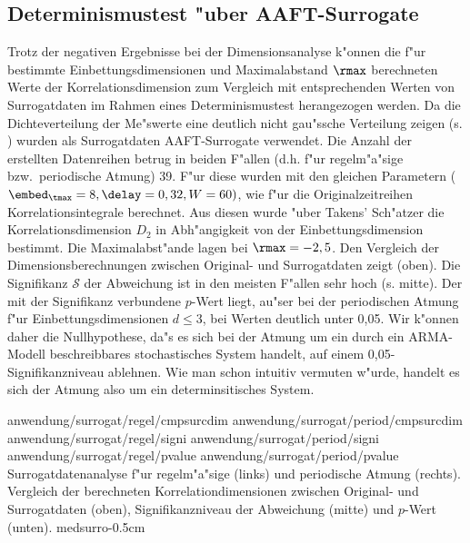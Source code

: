 \subsection{Determinismustest "uber AAFT-Surrogate}

Trotz der negativen Ergebnisse bei der Dimensionsanalyse k"onnen die f"ur bestimmte
Einbettungsdimensionen und Maximalabstand $\rmax$ berechneten Werte der
Korrelationsdimension zum Vergleich mit entsprechenden Werten von Surrogatdaten im Rahmen
eines Determinismustest herangezogen werden. Da die Dichteverteilung der Me"swerte eine
deutlich nicht gau"ssche Verteilung zeigen (s. ) wurden als Surrogatdaten
AAFT-Surrogate verwendet. Die Anzahl der erstellten Datenreihen betrug in beiden F"allen
(d.h. f"ur regelm"a"sige bzw.\ periodische Atmung) 39. F"ur diese wurden mit den gleichen
Parametern ($\embed_\tmax=8, \delay=0,32, W=60)$, wie f"ur die Originalzeitreihen
Korrelationsintegrale berechnet. Aus diesen wurde "uber Takens' Sch"atzer die
Korrelationsdimension $D_2$ in Abh"angigkeit von der Einbettungsdimension bestimmt. Die
Maximalabst"ande lagen bei $\rmax=-2,5$. Den Vergleich der Dimensionsberechnungen zwischen
Original- und Surrogatdaten zeigt  (oben).  Die Signifikanz $\mathcal S$
der Abweichung ist in den meisten F"allen sehr hoch (s.   mitte). Der mit
der Signifikanz verbundene $p$-Wert liegt, au"ser bei der periodischen Atmung f"ur
Einbettungsdimensionen $d\leq3$, bei Werten deutlich unter 0,05. Wir k"onnen daher die
Nullhypothese, da"s es sich bei der Atmung um ein durch ein ARMA-Modell beschreibbares
stochastisches System handelt, auf einem 0,05-Signifikanzniveau ablehnen. Wie man schon
intuitiv vermuten w"urde, handelt es sich der Atmung also um ein determinsitisches System.

\epsfigsix
{anwendung/surrogat/regel/cmpsurcdim}
{anwendung/surrogat/period/cmpsurcdim}
{anwendung/surrogat/regel/signi}
{anwendung/surrogat/period/signi}
{anwendung/surrogat/regel/pvalue}
{anwendung/surrogat/period/pvalue}
{
Surrogatdatenanalyse f"ur regelm"a"sige (links) und periodische Atmung (rechts). 
Vergleich der berechneten Korrelationdimensionen zwischen Original- und Surrogatdaten
(oben), Signifikanzniveau der Abweichung (mitte) und $p$-Wert (unten).
}
{medsurro}{-0.5cm}





